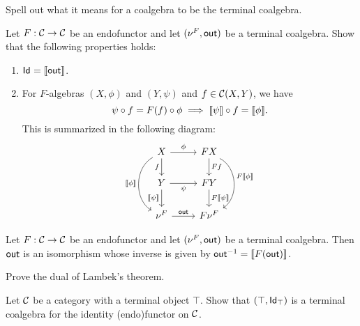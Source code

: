 \begin{exer} Spell out what it means for a coalgebra to be the terminal coalgebra.
\end{exer}

\begin{exer} Let $F:\CC\to\CC$ be an endofunctor and let $(\Terminalcoalg{F}, \Out)$ be a terminal coalgebra. Show that the following properties holds:
\begin{enumerate}
\item $\Id = \anam{\Out}$.
\item For $F$-algebras $(X,\phi)$ and $(Y,\psi)$ and $f\in\CHom{\CC}{X}{Y}$, we have 
\[
  \co f \psi   = \co \phi {F(f)} \implies \co{f}{\anam{\psi}} = \anam{\phi}.
\]
This is summarized in the following diagram:
\[
\begin{tikzcd}
X
\arrow[r, "\phi"] 
\arrow[d,swap, "f"]
\ar[dd, "\anam{\phi}"', bend right = 60]
&
FX
\arrow[d, "Ff"]
\ar[dd, "F\anam{\phi}", bend left = 60]
\\
Y
\arrow[r, swap, "\psi"]
\ar[d, "\anam{\psi}"']
&
FY
\ar[d, "F\anam{\psi}"]
\\
\Terminalcoalg{F}
\ar[r, "\Out"]
&
F\Terminalcoalg{F}
\end{tikzcd}
\]
\end{enumerate} 
\end{exer}

\begin{thm} Let $F:\CC\to\CC$ be an endofunctor and let $(\Terminalcoalg{F}, \Out)$ be a terminal coalgebra. Then $\Out$ is an isomorphism whose inverse is given by $\Inv{\Out} = \anam{F(\Out)}$.
\end{thm}

\begin{exer}
  Prove the dual of Lambek's theorem. 
\end{exer}

\begin{exer}\label{exer:terminalalg_for_idfun_with_terminalob} Let $\CC$ be a category with a terminal object $\top$. Show that $(\top, \Id[\top])$ is a terminal coalgebra for the identity (endo)functor on $\CC$.
\end{exer}

